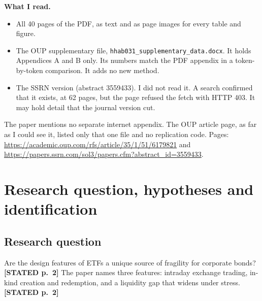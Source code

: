 \documentclass[10pt,a4paper]{article}
\newcommand{\ST}[1]{\textcolor{cst}{\textbf{[STATED #1]}}}
\begin{document}
\textbf{What I read.}
\begin{itemize}
\item All 40 pages of the PDF, as text and as page images for every table and figure.
\item The OUP supplementary file, \texttt{hhab031\_supplementary\_data.docx}. It holds Appendices A and B only. Its numbers match the PDF appendix in a token-by-token comparison. It adds no new method.
\item The SSRN version (abstract 3559433). I did not read it. A search confirmed that it exists, at 62 pages, but the page refused the fetch with HTTP 403. It may hold detail that the journal version cut.
\end{itemize}
The paper mentions no separate internet appendix. The OUP article page, as far as I could see it, listed only that one file and no replication code. Pages: \url{https://academic.oup.com/rfs/article/35/1/51/6179821} and \url{https://papers.ssrn.com/sol3/papers.cfm?abstract_id=3559433}.

\section{Research question, hypotheses and identification}\label{sec:rq}

\subsection{Research question}
Are the design features of ETFs a unique source of fragility for corporate bonds? \ST{p.~2} The paper names three features: intraday exchange trading, in-kind creation and redemption, and a liquidity gap that widens under stress. \ST{p.~2}
\end{document}
